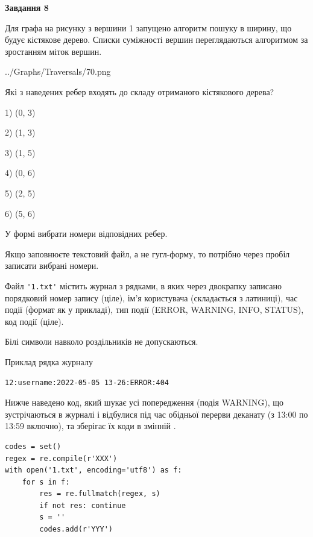 \documentclass[12pt, ukrainian]{article}
\def\code#1{\Verb!#1!}
\begin{document}
{\begin {large}
{\begin {center}\textbf{Завдання 8}\end {center}}\par
Для графа на рисунку з вершини 1 запущено алгоритм пошуку в ширину, що будує кістякове дерево. Списки суміжності вершин переглядаються алгоритмом за зростанням міток вершин.\par
\begin{center}
	{../Graphs/Traversals/70.png}
\end{center}
\par Які з наведених ребер входять до складу отриманого кістякового дерева?\par
1) (0, 3)\par
2) (1, 3)\par
3) (1, 5)\par
4) (0, 6)\par
5) (2, 5)\par
6) (5, 6)\par
{\vskip 15pt} У формі вибрати номери відповідних ребер.


Якщо заповнюєте текстовий файл, а не гугл-форму, то потрібно через пробіл записа\-ти вибрані номери.\par
\newpage


Файл \code{'1.txt'} містить журнал з рядками, в яких через двокрапку записано поряд\-ко\-вий номер запису (ціле), ім'я користувача (складається з латиниці), час події (фор\-мат як у прикладі), тип події (ERROR, WARNING, INFO, STATUS), код події (ціле).

Білі символи навколо роздільників не допускаються.

Приклад рядка журналу



\begin{verbatim}
12:username:2022-05-05 13-26:ERROR:404
\end{verbatim}


Нижче наведено код, який шукає усі попередження (подія WARNING), що зустрі\-ча\-ються в журналі і відбулися під час обідньої перерви деканату (з 13:00 по 13:59 включно), та зберігає їх коди в змінній .



\begin{verbatim}
codes = set()
regex = re.compile(r'XXX')
with open('1.txt', encoding='utf8') as f:
    for s in f:
        res = re.fullmatch(regex, s)
        if not res: continue
        s = ''
        codes.add(r'YYY')
\end{verbatim}





\end{large}}
\end{document}
